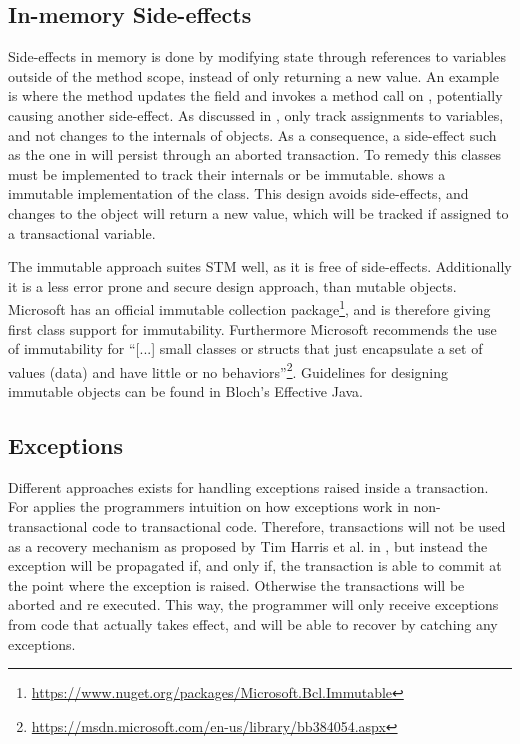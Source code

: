 \subsection{In-memory Side-effects}
Side-effects in memory is done by modifying state through references to variables outside of the method scope, instead of only returning a new value. An example is  where the  method updates the field  and invokes a method call on , potentially causing another side-effect. As discussed in , \stmname only track assignments to variables, and not changes to the internals of objects. As a consequence, a side-effect such as the one in  will persist through an aborted transaction. To remedy this classes must be implemented to track their internals or be immutable.  shows a immutable implementation of the   class. This design avoids side-effects, and changes to the object will return a new value, which will be tracked if assigned to a transactional variable.

The immutable approach suites \ac{STM} well, as it is free of side-effects. Additionally it is a less error prone and secure design approach, than mutable objects\cite[p. 73]{bloch2008effective}. Microsoft has an official immutable collection package\footnote{\url{https://www.nuget.org/packages/Microsoft.Bcl.Immutable}}, and is therefore giving first class support for immutability. Furthermore Microsoft recommends the use of immutability for ``[...] small classes or structs that just encapsulate a set of values (data) and have little or no behaviors''\footnote{\url{https://msdn.microsoft.com/en-us/library/bb384054.aspx}}. Guidelines for designing immutable objects can be found in Bloch's Effective Java\cite[p. 73-80]{bloch2008effective}.

\subsection{Exceptions}
Different approaches exists for handling exceptions raised inside a transaction. For \stmnamesp applies the programmers intuition on how exceptions work in non-transactional  code to transactional code. Therefore, transactions will not be used as a recovery mechanism as proposed by Tim Harris et al. in \cite{harris2005exceptions}, but instead the exception will be propagated if, and only if, the transaction is able to commit at the point where the exception is raised. Otherwise the transactions will be aborted and re executed. This way, the programmer will only receive exceptions from code that actually takes effect, and will be able to recover by catching any exceptions.

